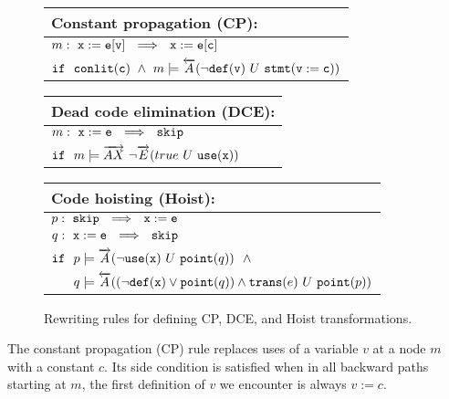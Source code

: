 \begin{figure}[ht]
\begin{center}
\begin{small}

\begin{tabularx}{0.8\textwidth}{|X|}\hline
{\bf Constant propagation} (CP):\\\hline
$m: ~ {\tt x:=e[v]} ~~ \Longrightarrow ~~ {\tt x:=e[c]}$ \\
${\tt if} ~~ \text{${\tt conlit}$}(\text{${\tt c}$}) ~ \wedge ~ m \models \overleftarrow{A}(\neg\text{${\tt def}$}(\text{${\tt v}$}) ~ U ~ \text{${\tt stmt}$}({\tt v:=c}))$ \\\hline
\end{tabularx}

\vspace{2mm}

\begin{tabularx}{0.8\textwidth}{|X|}\hline
{\bf Dead code elimination} (DCE):\\\hline
$m: ~ {\tt x:=e} ~~ \Longrightarrow ~~ {\tt skip}$ \\
${\tt if} ~~ m \models \overrightarrow{AX} ~ \neg\overrightarrow{E}(true ~ U ~ \text{${\tt use}$}(\text{${\tt x}$}))$ \\\hline
\end{tabularx}

\vspace{2mm}

\begin{tabularx}{0.8\textwidth}{|X|}\hline
{\bf Code hoisting} (Hoist):\\\hline
$p: ~ {\tt skip} ~~ \Longrightarrow ~~ {\tt x:=e}$ \\
$q: ~ {\tt x:=e} ~~ \Longrightarrow ~~ {\tt skip}$ \\
${\tt if} ~~ p \models \overrightarrow{A}(\neg\text{${\tt use}$}(\text{${\tt x}$}) ~ U ~ \text{${\tt point}$}(q)) ~~ \wedge$ \\
$\hphantom{\texttt{if}} ~~ q \models \overleftarrow{A}((\neg\wdef(\wx)\vee\wpoint(q))\wedge \wtrans(e) ~ U ~ \wpoint(p))$ \\\hline
\end{tabularx}

\vspace{-2mm}

\end{small}
\end{center}
\caption{\label{fig:sample-trans} Rewriting rules for defining CP, DCE, and Hoist transformations.}
\end{figure}

\noindent The constant propagation (CP) rule replaces uses of a variable $v$ at a node $m$ with a constant $c$. Its side condition is satisfied when in all backward paths starting at $m$, the first definition of $v$ we encounter is always $v:=c$.

